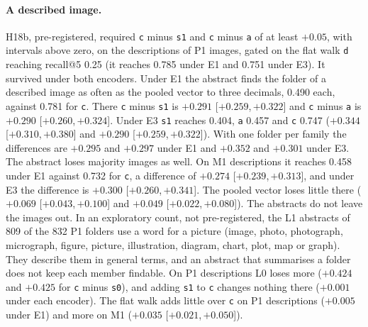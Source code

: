 \documentclass[11pt]{article}
\newcommand{\rep}[1]{\texttt{#1}}
\newcommand{\ci}[2]{[\ensuremath{#1},\,\ensuremath{#2}]}  %
\begin{document}
\paragraph{A described image.} H18b, pre-registered, required \rep{c} minus \rep{s1} and \rep{c} minus \rep{a} of at least $+0.05$, with intervals above zero, on the descriptions of P1 images, gated on the flat walk \rep{d} reaching recall@5 0.25 (it reaches 0.785 under E1 and 0.751 under E3). It survived under both encoders. Under E1 the abstract finds the folder of a described image as often as the pooled vector to three decimals, 0.490 each, against 0.781 for \rep{c}. There \rep{c} minus \rep{s1} is $+0.291$ \ci{+0.259}{+0.322} and \rep{c} minus \rep{a} is $+0.290$ \ci{+0.260}{+0.324}. Under E3 \rep{s1} reaches 0.404, \rep{a} 0.457 and \rep{c} 0.747 ($+0.344$ \ci{+0.310}{+0.380} and $+0.290$ \ci{+0.259}{+0.322}). With one folder per family the differences are $+0.295$ and $+0.297$ under E1 and $+0.352$ and $+0.301$ under E3. The abstract loses majority images as well. On M1 descriptions it reaches 0.458 under E1 against 0.732 for \rep{c}, a difference of $+0.274$ \ci{+0.239}{+0.313}, and under E3 the difference is $+0.300$ \ci{+0.260}{+0.341}. The pooled vector loses little there ($+0.069$ \ci{+0.043}{+0.100} and $+0.049$ \ci{+0.022}{+0.080}). The abstracts do not leave the images out. In an exploratory count, not pre-registered, the L1 abstracts of 809 of the 832 P1 folders use a word for a picture (image, photo, photograph, micrograph, figure, picture, illustration, diagram, chart, plot, map or graph). They describe them in general terms, and an abstract that summarises a folder does not keep each member findable. On P1 descriptions L0 loses more ($+0.424$ and $+0.425$ for \rep{c} minus \rep{s0}), and adding \rep{s1} to \rep{c} changes nothing there ($+0.001$ under each encoder). The flat walk adds little over \rep{c} on P1 descriptions ($+0.005$ under E1) and more on M1 ($+0.035$ \ci{+0.021}{+0.050}).
\end{document}
